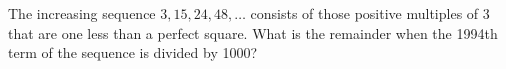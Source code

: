 The increasing sequence $3, 15, 24, 48, \ldots$ consists of those positive multiples of 3 that are one less than a perfect square.  What is the remainder when the 1994th term of the sequence is divided by 1000?